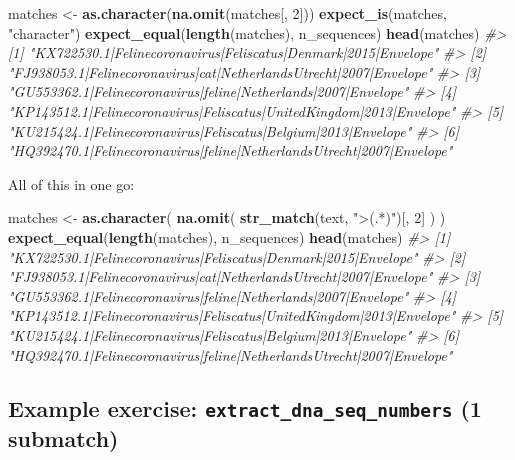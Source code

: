 \documentclass[]{book}
\newenvironment{Shaded}{}{}
\newcommand{\CommentTok}[1]{\textcolor[rgb]{0.38,0.63,0.69}{\textit{#1}}}
\newcommand{\DecValTok}[1]{\textcolor[rgb]{0.25,0.63,0.44}{#1}}
\newcommand{\KeywordTok}[1]{\textcolor[rgb]{0.00,0.44,0.13}{\textbf{#1}}}
\newcommand{\NormalTok}[1]{#1}
\newcommand{\StringTok}[1]{\textcolor[rgb]{0.25,0.44,0.63}{#1}}
\begin{document}
\begin{Shaded}
\begin{Highlighting}[]
\NormalTok{matches <-}\StringTok{ }\KeywordTok{as.character}\NormalTok{(}\KeywordTok{na.omit}\NormalTok{(matches[, }\DecValTok{2}\NormalTok{]))}
\KeywordTok{expect_is}\NormalTok{(matches, }\StringTok{"character"}\NormalTok{)}
\KeywordTok{expect_equal}\NormalTok{(}\KeywordTok{length}\NormalTok{(matches), n_sequences)}
\KeywordTok{head}\NormalTok{(matches)}
\CommentTok{#> [1] "KX722530.1|Felinecoronavirus|Feliscatus|Denmark|2015|Envelope"       }
\CommentTok{#> [2] "FJ938053.1|Felinecoronavirus|cat|NetherlandsUtrecht|2007|Envelope"   }
\CommentTok{#> [3] "GU553362.1|Felinecoronavirus|feline|Netherlands|2007|Envelope"       }
\CommentTok{#> [4] "KP143512.1|Felinecoronavirus|Feliscatus|UnitedKingdom|2013|Envelope" }
\CommentTok{#> [5] "KU215424.1|Felinecoronavirus|Feliscatus|Belgium|2013|Envelope"       }
\CommentTok{#> [6] "HQ392470.1|Felinecoronavirus|feline|NetherlandsUtrecht|2007|Envelope"}
\end{Highlighting}
\end{Shaded}

All of this in one go:

\begin{Shaded}
\begin{Highlighting}[]
\NormalTok{matches <-}\StringTok{ }\KeywordTok{as.character}\NormalTok{(}
  \KeywordTok{na.omit}\NormalTok{(}
    \KeywordTok{str_match}\NormalTok{(text, }\StringTok{">(.*)"}\NormalTok{)[, }\DecValTok{2}\NormalTok{]}
\NormalTok{  )}
\NormalTok{)}
\KeywordTok{expect_equal}\NormalTok{(}\KeywordTok{length}\NormalTok{(matches), n_sequences)}
\KeywordTok{head}\NormalTok{(matches)}
\CommentTok{#> [1] "KX722530.1|Felinecoronavirus|Feliscatus|Denmark|2015|Envelope"       }
\CommentTok{#> [2] "FJ938053.1|Felinecoronavirus|cat|NetherlandsUtrecht|2007|Envelope"   }
\CommentTok{#> [3] "GU553362.1|Felinecoronavirus|feline|Netherlands|2007|Envelope"       }
\CommentTok{#> [4] "KP143512.1|Felinecoronavirus|Feliscatus|UnitedKingdom|2013|Envelope" }
\CommentTok{#> [5] "KU215424.1|Felinecoronavirus|Feliscatus|Belgium|2013|Envelope"       }
\CommentTok{#> [6] "HQ392470.1|Felinecoronavirus|feline|NetherlandsUtrecht|2007|Envelope"}
\end{Highlighting}
\end{Shaded}

\hypertarget{example-exercise-extract_dna_seq_numbers-1-submatch}{%
\subsection{\texorpdfstring{Example exercise: \texttt{extract\_dna\_seq\_numbers} (1 submatch)}{Example exercise: extract\_dna\_seq\_numbers (1 submatch)}}\label{example-exercise-extract_dna_seq_numbers-1-submatch}}
\end{document}
